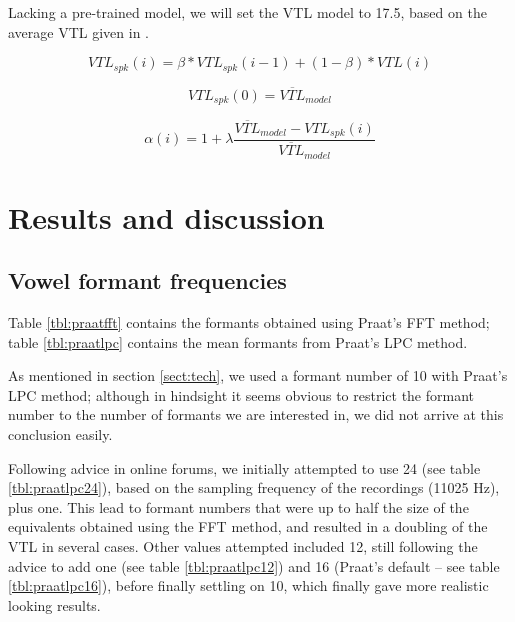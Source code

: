 \documentclass[11pt]{article}
\begin{document}
Lacking a pre-trained model, we will set the VTL model to 17.5, based on the average VTL given in \citet[p. 119]{ladefoged1996elements}.

\begin{equation}
\label{rodriguez2010line1}
VTL_{spk}(i) = \beta * VTL_{spk}(i - 1) + (1 - \beta) * VTL(i)
\end{equation}

\begin{equation}
\label{rodriguez2010line2}
VTL_{spk}(0) = \overline{VTL}_{model}
\end{equation}

\begin{equation}
\label{rodriguez2010line3}
\alpha(i) = 1 + \lambda\frac{\overline{VTL}_{model} - VTL_{spk}(i)}{\overline{VTL}_{model}}
\end{equation}

\section{Results and discussion}
\label{sect:res}

\subsection{Vowel formant frequencies}
\label{sect:vff}
Table \ref{tbl:praatfft} contains the formants obtained using Praat's FFT method; table \ref{tbl:praatlpc} contains the mean formants from Praat's LPC method.

As mentioned in section \ref{sect:tech}, we used a formant number of 10 with Praat's LPC method; although in hindsight it seems obvious to restrict the formant number to the number of formants we are interested in, we did not arrive at this conclusion easily. 

Following advice in online forums, we initially attempted to use 24 (see table \ref{tbl:praatlpc24}), based on the sampling frequency of the recordings (11025 Hz), plus one. This lead to formant numbers that were up to half the size of the equivalents obtained using the FFT method, and resulted in a doubling of the VTL in several cases. Other values attempted included 12, still following the advice to add one (see table \ref{tbl:praatlpc12}) and 16 (Praat's default -- see table \ref{tbl:praatlpc16}), before finally settling on 10, which finally gave more realistic looking results.
\end{document}
